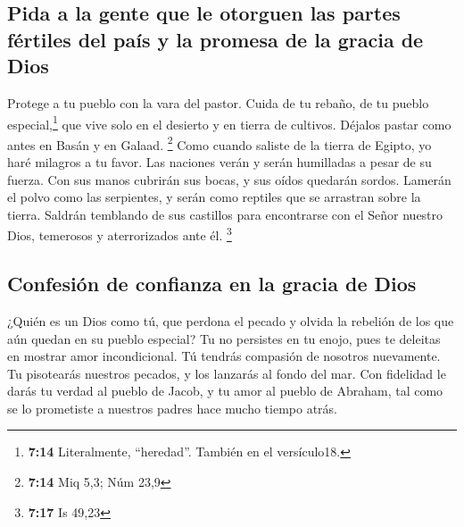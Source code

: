 \hypertarget{pida-a-la-gente-que-le-otorguen-las-partes-fuxe9rtiles-del-pauxeds-y-la-promesa-de-la-gracia-de-dios}{%
\subsection{Pida a la gente que le otorguen las partes fértiles del país
y la promesa de la gracia de
Dios}\label{pida-a-la-gente-que-le-otorguen-las-partes-fuxe9rtiles-del-pauxeds-y-la-promesa-de-la-gracia-de-dios}}

 Protege a tu pueblo con la vara del pastor. Cuida de tu
rebaño, de tu pueblo especial,\footnote{\textbf{7:14} Literalmente,
  ``heredad''. También en el versículo18.} que vive solo en el desierto
y en tierra de cultivos. Déjalos pastar como antes en Basán y en Galaad.
\footnote{\textbf{7:14} Miq 5,3; Núm 23,9}  Como cuando
saliste de la tierra de Egipto, yo haré milagros a tu favor.
 Las naciones verán y serán humilladas a pesar de su
fuerza. Con sus manos cubrirán sus bocas, y sus oídos quedarán sordos.
 Lamerán el polvo como las serpientes, y serán como
reptiles que se arrastran sobre la tierra. Saldrán temblando de sus
castillos para encontrarse con el Señor nuestro Dios, temerosos y
aterrorizados ante él. \footnote{\textbf{7:17} Is 49,23}

\hypertarget{confesiuxf3n-de-confianza-en-la-gracia-de-dios}{%
\subsection{Confesión de confianza en la gracia de
Dios}\label{confesiuxf3n-de-confianza-en-la-gracia-de-dios}}

 ¿Quién es un Dios como tú, que perdona el pecado y
olvida la rebelión de los que aún quedan en su pueblo especial? Tu no
persistes en tu enojo, pues te deleitas en mostrar amor incondicional.
 Tú tendrás compasión de nosotros nuevamente. Tu
pisotearás nuestros pecados, y los lanzarás al fondo del mar.
 Con fidelidad le darás tu verdad al pueblo de Jacob, y
tu amor al pueblo de Abraham, tal como se lo prometiste a nuestros
padres hace mucho tiempo atrás.
